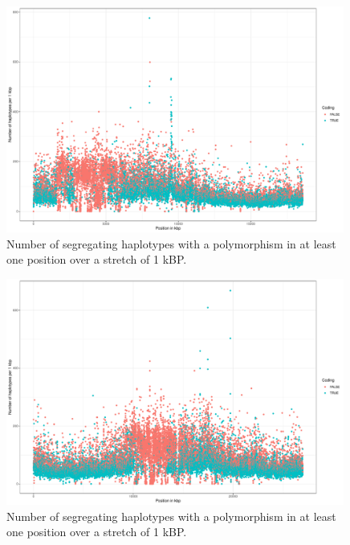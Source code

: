 \begin{figure}[th]
\centering
\includegraphics[height=.55\textheight, width=0.99\textwidth]{Figures/chr4_hap}
\decoRule
\caption[Haplotype strutcture of chromosome 4 of \textit{A. thaliana}]{Number of segregating haplotypes with a polymorphism in at least one position over a stretch of 1 kBP. }
\label{fig:chr4}
\end{figure}


\begin{figure}[th]
\centering
\includegraphics[height=.55\textheight, width=0.99\textwidth]{Figures/chr5_hap}
\decoRule
\caption[Haplotype strutcture of chromosome 5 of \textit{A. thaliana}]{Number of segregating haplotypes with a polymorphism in at least one position over a stretch of 1 kBP. }
\label{fig:chr5}
\end{figure}



